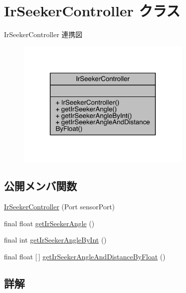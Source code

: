 \hypertarget{class_ir_seeker_controller}{}\section{Ir\+Seeker\+Controller クラス}
\label{class_ir_seeker_controller}


Ir\+Seeker\+Controller 連携図
\nopagebreak
\begin{figure}[H]
\begin{center}
\leavevmode
\includegraphics[width=239pt]{d0/d4d/class_ir_seeker_controller__coll__graph}
\end{center}
\end{figure}
\subsection*{公開メンバ関数}
\begin{DoxyCompactItemize}
\item 
\mbox{\hyperlink{class_ir_seeker_controller_a5013fb830f68f74855f46d6748af1a71}{Ir\+Seeker\+Controller}} (Port sensor\+Port)
\item 
final float \mbox{\hyperlink{class_ir_seeker_controller_a71fb9a9096eebd286ef0f02c6f603468}{get\+Ir\+Seeker\+Angle}} ()
\item 
final int \mbox{\hyperlink{class_ir_seeker_controller_ae8eeef8c000dbea552f843f8b97630e7}{get\+Ir\+Seeker\+Angle\+By\+Int}} ()
\item 
final float \mbox{[}$\,$\mbox{]} \mbox{\hyperlink{class_ir_seeker_controller_a554c0174b99e64201156d05434781bb3}{get\+Ir\+Seeker\+Angle\+And\+Distance\+By\+Float}} ()
\end{DoxyCompactItemize}


\subsection{詳解}


